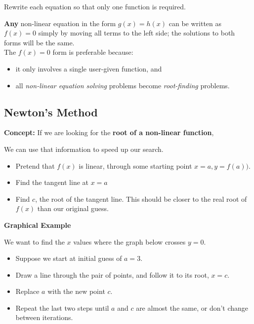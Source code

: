 Rewrite each equation so that only one function is
  required.

\vfill

\newpage

{\bf Any} non-linear equation in the form $g(x) = h(x)$ can be written
as $f(x) = 0$ simply by moving all terms to the left side; the
solutions to both forms will be the same.  \\[1ex]

The $f(x) = 0$ form is preferable because:
\begin{itemize}
\item it only involves a single user-given function, and \\
\item all {\em non-linear equation solving} problems become {\em
    root-finding} problems.
\end{itemize}

\newpage

\subsection*{Newton's Method}

{\bf Concept:} If we are looking for the {\bf root of a non-linear
  function},

We can use that information to speed up our search.
\begin{itemize}
\item Pretend that $f(x)$ is linear, through some starting point
  $x=a, y=f(a))$.
\item Find the tangent line at $x=a$
\item Find $c$, the root of the tangent line. This should be closer to
  the real root of $f(x)$ than our original guess.
\end{itemize}

\newpage

{\bf Graphical Example} 

We want to find the $x$ values where the graph below crosses $y=0$.

\begin{itemize}
\item Suppose we start at initial guess of $a = 3$.
\item Draw a line through the pair of points, and follow it to its
  root, $x=c$.
\item Replace $a$ with the new point $c$.
\item Repeat the last two steps until $a$ and $c$ are almost the same,
  or don't change between iterations.
\end{itemize}

